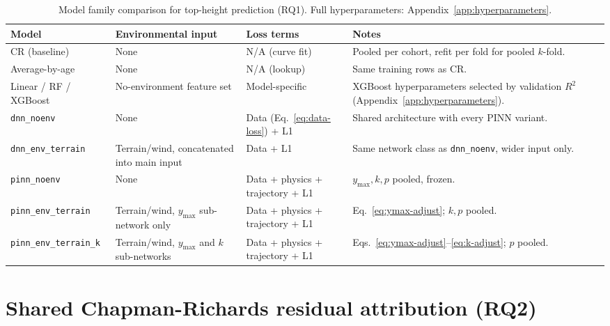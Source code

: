 \begin{table}[!htbp]
\centering
\scriptsize
\renewcommand{\arraystretch}{1.2}
\begin{tabular}{p{2.3cm}p{3cm}p{2.6cm}p{4.5cm}}
\toprule
Model & Environmental input & Loss terms & Notes \\
\midrule
CR (baseline) & None & N/A (curve fit) & Pooled per cohort, refit per fold for pooled $k$-fold. \\
Average-by-age & None & N/A (lookup) & Same training rows as CR. \\
Linear / RF / XGBoost & No-environment feature set & Model-specific & XGBoost hyperparameters
selected by validation $R^2$ (Appendix~\ref{app:hyperparameters}). \\
\texttt{dnn\_noenv} & None & Data (Eq.~\ref{eq:data-loss}) + L1 & Shared architecture with every
PINN variant. \\
\texttt{dnn\_env\_terrain} & Terrain/wind, concatenated into main input & Data + L1 & Same network
class as \texttt{dnn\_noenv}, wider input only. \\
\texttt{pinn\_noenv} & None & Data + physics + trajectory + L1 & $y_{\max},k,p$ pooled, frozen. \\
\texttt{pinn\_env\_terrain} & Terrain/wind, $y_{\max}$ sub-network only & Data + physics +
trajectory + L1 & Eq.~\ref{eq:ymax-adjust}; $k,p$ pooled. \\
\texttt{pinn\_env\_terrain\_k} & Terrain/wind, $y_{\max}$ and $k$ sub-networks & Data + physics +
trajectory + L1 & Eqs.~\ref{eq:ymax-adjust}--\ref{eq:k-adjust}; $p$ pooled. \\
\bottomrule
\end{tabular}
\caption{Model family comparison for top-height prediction (RQ1). Full hyperparameters:
Appendix~\ref{app:hyperparameters}.}
\label{tab:rq1-models}
\end{table}

\section{Shared Chapman-Richards residual attribution (RQ2)}
\label{sec:rq2}


